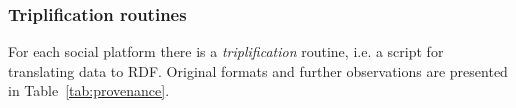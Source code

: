 																																																																																																																																																																																																																																																																																																																																																																																																															\subsubsection{Triplification routines}
																																																																																																																																																																																																																																																																																																																																																																																																															For each social platform there is a \emph{triplification} routine,
																																																																																																																																																																																																																																																																																																																																																																																																															i.e. a script for translating data to RDF.
																																																																																																																																																																																																																																																																																																																																																																																																															Original formats and further observations are presented in
																																																																																																																																																																																																																																																																																																																																																																																																															Table~\ref{tab:provenance}.
